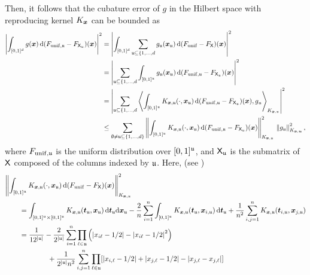 \documentclass[letterpaper]{amsart}
\newcommand{\KX}{{K_{\vx}}}
\newcommand{\KXu}{K_{\vx,\fu}}
\begin{document}
Then, it follows that the cubature error of $g$ in the Hilbert space with reproducing kernel $\KX$ can be bounded as
\begin{align*}
	\abs{\int_{[0,1]^d} g(\vx) \,  \dif (F_{\mathrm{unif},\fu} - F_{\mX_\fu})(\vx)}^2
	& = \abs{\int_{[0,1]^d} \sum_{\fu \subseteq \{1, \ldots, d} g_{\fu}(\vx_\fu) \,  \dif (F_{\mathrm{unif}} - F_{\mX})(\vx)}^2\\
	& = \abs{\sum_{\fu \subseteq \{1, \ldots, d} \int_{[0,1]^\fu} g_{\fu}(\vx_\fu) \,  \dif (F_{\mathrm{unif},\fu} - F_{\mX_\fu})(\vx)}^2\\
	& = \abs{\sum_{\fu \subseteq \{1, \ldots, d} \ip[K_{\vx,\fu}]{\int_{[0,1]^{\fu}} K_{\vx,\fu}(\cdot,\vx_\fu) \,  \dif (F_{\mathrm{unif},\fu} - F_{\mX_\fu})(\vx)}{g_u}}^2 \\
	\nonumber
	& \le  \sum_{\emptyset \ne \fu \subseteq \{1, \ldots, d\}} \norm[\KXu]{\int_{[0,1]^\fu} K_{\vx,\fu}(\cdot,\vx_\fu) \,  \dif (F_{\mathrm{unif},\fu} - F_{\mX_\fu})(\vx)}^2\, \norm[K_{\vx,\vu}]{g_\fu }^2,
\end{align*}
where $F_{\mathrm{unif},\mathfrak{u}}$ is the uniform distribution over $[0,1]^{\mathfrak{u}}$, and $\mathsf{X}_{\mathfrak{u}}$ is the submatrix of $\mathsf{X}$ composed of the columns indexed by $\mathfrak{u}$.
Here, (see \cite{Hic99b})
\begin{align*}
	\MoveEqLeft{\norm[\KXu]{\int_{[0,1]^\fu} K_{\vx,\fu}(\cdot,\vx_\fu) \,  \dif (F_{\mathrm{unif}} - F_{\mX})(\vx)}^2} \\
	 & =
	\int_{[0,1]^{\fu} \times [0,1]^{\fu}}  K_{\vx,\fu}(\vt_\fu,\vx_\fu) \,  \dif \vt_\fu \dif \vx_\fu
	- \frac 2n \sum_{i=1}^n \int_{[0,1]^{\fu}} K_{\vx,\fu}(\vt_\fu,\vx_{i,\fu}) \,  \dif \vt_\fu
	+ \frac 1 {n^2} \sum_{i,j=1}^n K_{\vx,\fu}(\vt_{i,\fu},\vx_{j,\fu}) \\
	& = \frac{1}{12^{\abs{\fu}}} - \frac {2}{2^{\abs{\fu}}} \sum_{i=1}^n \prod_{\ell \in \fu} \left(\abs{x_{i\ell} - 1/2} - \abs{x_{i\ell} - 1/2}^2 \right) \\
	& \qquad \qquad + \frac 1 {2^{\abs{\fu}}n^2} \sum_{i,j=1}^n
	\prod_{\ell \in \fu} [\abs{x_{i,\ell} -1/2} + \abs{x_{j,\ell}-1/2} - \abs{x_{j,\ell}  - x_{j,\ell}}]
\end{align*}
\end{document}
